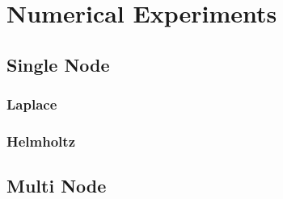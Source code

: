 \chapter{Numerical Experiments}\label{chpt:experiments}
\thispagestyle{chaptertitle} %


\section{Single Node}

\subsection{Laplace}

\subsection{Helmholtz}


\section{Multi Node}

